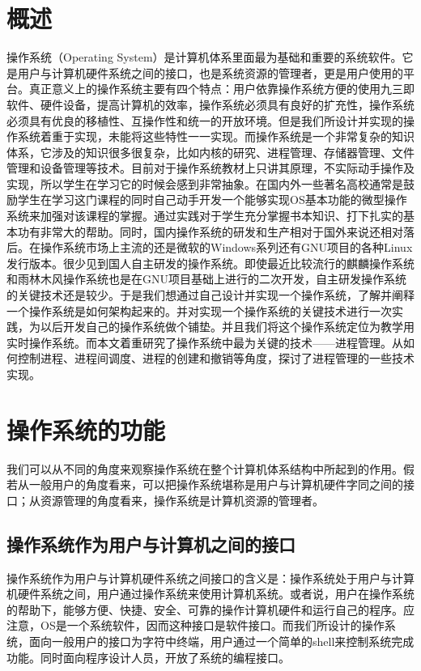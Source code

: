 \documentclass[UTF8,nofonts,cs4size]{ctexrep}
\begin{document}
\section{概述}
操作系统（Operating System）是计算机体系里面最为基础和重要的系统软件。它是用户与计算机硬件系统之间的接口，也是系统资源的管理者，更是用户使用的平台。真正意义上的操作系统主要有四个特点：用户依靠操作系统方便的使用九三即软件、硬件设备，提高计算机的效率，操作系统必须具有良好的扩充性，操作系统必须具有优良的移植性、互操作性和统一的开放环境。但是我们所设计并实现的操作系统着重于实现，未能将这些特性一一实现。而操作系统是一个非常复杂的知识体系，它涉及的知识很多很复杂，比如内核的研究、进程管理、存储器管理、文件管理和设备管理等技术。目前对于操作系统教材上只讲其原理，不实际动手操作及实现，所以学生在学习它的时候会感到非常抽象。在国内外一些著名高校通常是鼓励学生在学习这门课程的同时自己动手开发一个能够实现OS基本功能的微型操作系统来加强对该课程的掌握。通过实践对于学生充分掌握书本知识、打下扎实的基本功有非常大的帮助。同时，国内操作系统的研发和生产相对于国外来说还相对落后。在操作系统市场上主流的还是微软的Windows系列还有GNU项目的各种Linux发行版本。很少见到国人自主研发的操作系统。即使最近比较流行的麒麟操作系统和雨林木风操作系统也是在GNU项目基础上进行的二次开发，自主研发操作系统的关键技术还是较少。于是我们想通过自己设计并实现一个操作系统，了解并阐释一个操作系统是如何架构起来的。并对实现一个操作系统的关键技术进行一次实践，为以后开发自己的操作系统做个铺垫。并且我们将这个操作系统定位为教学用实时操作系统。而本文着重研究了操作系统中最为关键的技术——进程管理。从如何控制进程、进程间调度、进程的创建和撤销等角度，探讨了进程管理的一些技术实现。
\section{操作系统的功能}
我们可以从不同的角度来观察操作系统在整个计算机体系结构中所起到的作用。假若从一般用户的角度看来，可以把操作系统堪称是用户与计算机硬件字同之间的接口；从资源管理的角度看来，操作系统是计算机资源的管理者。
\subsection{操作系统作为用户与计算机之间的接口}
操作系统作为用户与计算机硬件系统之间接口的含义是：操作系统处于用户与计算机硬件系统之间，用户通过操作系统来使用计算机系统。或者说，用户在操作系统的帮助下，能够方便、快捷、安全、可靠的操作计算机硬件和运行自己的程序。应注意，OS是一个系统软件，因而这种接口是软件接口。而我们所设计的操作系统，面向一般用户的接口为字符中终端，用户通过一个简单的shell来控制系统完成功能。同时面向程序设计人员，开放了系统的编程接口。
\end{document}
